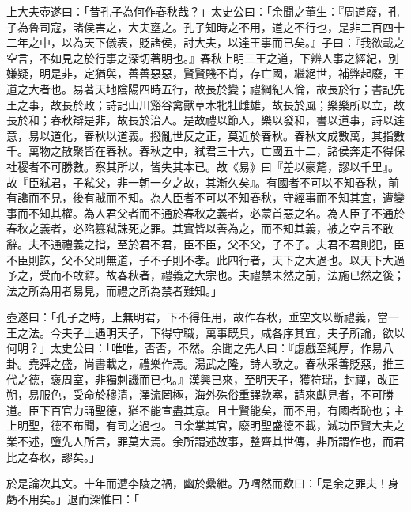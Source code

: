 \begin{pinyinscope}
上大夫壺遂曰：「昔孔子為何作春秋哉？」太史公曰：「余聞之董生：『周道廢，孔子為魯司寇，諸侯害之，大夫壅之。孔子知時之不用，道之不行也，是非二百四十二年之中，以為天下儀表，貶諸侯，討大夫，以達王事而已矣。』子曰：『我欲載之空言，不如見之於行事之深切著明也。』春秋上明三王之道，下辨人事之經紀，別嫌疑，明是非，定猶與，善善惡惡，賢賢賤不肖，存亡國，繼絕世，補弊起廢，王道之大者也。易著天地陰陽四時五行，故長於變；禮綱紀人倫，故長於行；書記先王之事，故長於政；詩記山川谿谷禽獸草木牝牡雌雄，故長於風；樂樂所以立，故長於和；春秋辯是非，故長於治人。是故禮以節人，樂以發和，書以道事，詩以達意，易以道化，春秋以道義。撥亂世反之正，莫近於春秋。春秋文成數萬，其指數千。萬物之散聚皆在春秋。春秋之中，弒君三十六，亡國五十二，諸侯奔走不得保社稷者不可勝數。察其所以，皆失其本已。故《易》曰『差以豪氂，謬以千里』。故『臣弒君，子弒父，非一朝一夕之故，其漸久矣』。有國者不可以不知春秋，前有讒而不見，後有賊而不知。為人臣者不可以不知春秋，守經事而不知其宜，遭變事而不知其權。為人君父者而不通於春秋之義者，必蒙首惡之名。為人臣子不通於春秋之義者，必陷篡弒誅死之罪。其實皆以善為之，而不知其義，被之空言不敢辭。夫不通禮義之指，至於君不君，臣不臣，父不父，子不子。夫君不君則犯，臣不臣則誅，父不父則無道，子不子則不孝。此四行者，天下之大過也。以天下大過予之，受而不敢辭。故春秋者，禮義之大宗也。夫禮禁未然之前，法施已然之後；法之所為用者易見，而禮之所為禁者難知。」

壺遂曰：「孔子之時，上無明君，下不得任用，故作春秋，垂空文以斷禮義，當一王之法。今夫子上遇明天子，下得守職，萬事既具，咸各序其宜，夫子所論，欲以何明？」太史公曰：「唯唯，否否，不然。余聞之先人曰：『虙戲至純厚，作易八卦。堯舜之盛，尚書載之，禮樂作焉。湯武之隆，詩人歌之。春秋采善貶惡，推三代之德，褒周室，非獨刺譏而已也。』漢興已來，至明天子，獲符瑞，封禪，改正朔，易服色，受命於穆清，澤流罔極，海外殊俗重譯款塞，請來獻見者，不可勝道。臣下百官力誦聖德，猶不能宣盡其意。且士賢能矣，而不用，有國者恥也；主上明聖，德不布聞，有司之過也。且余掌其官，廢明聖盛德不載，滅功臣賢大夫之業不述，墮先人所言，罪莫大焉。余所謂述故事，整齊其世傳，非所謂作也，而君比之春秋，謬矣。」

於是論次其文。十年而遭李陵之禍，幽於纍紲。乃喟然而歎曰：「是余之罪夫！身虧不用矣。」退而深惟曰：「


\end{pinyinscope}
